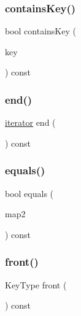 \mbox{\label{classMap_a37473445b6725c5f0fc59a32ea2e645e}} 
\subsubsection{\texorpdfstring{contains\+Key()}{containsKey()}}
{\footnotesize\ttfamily bool contains\+Key (\begin{DoxyParamCaption}\item[{const Key\+Type \&}]{key }\end{DoxyParamCaption}) const}

\mbox{\label{classMap_a68b688a51bd0cf6fb5bc2cba292209a8}} 
\subsubsection{\texorpdfstring{end()}{end()}}
{\footnotesize\ttfamily \mbox{\hyperlink{classMap_1_1iterator}{iterator}} end (\begin{DoxyParamCaption}{ }\end{DoxyParamCaption}) const\hspace{0.3cm}{\ttfamily [inline]}}

\mbox{\label{classMap_a91a1c833c72a288f2e2ea0207449513a}} 
\subsubsection{\texorpdfstring{equals()}{equals()}}
{\footnotesize\ttfamily bool equals (\begin{DoxyParamCaption}\item[{const \mbox{\hyperlink{classMap}{Map}}$<$ Key\+Type, Value\+Type $>$ \&}]{map2 }\end{DoxyParamCaption}) const}

\mbox{\label{classMap_a6e76878901fa73e176909ac015834f1a}} 
\subsubsection{\texorpdfstring{front()}{front()}}
{\footnotesize\ttfamily Key\+Type front (\begin{DoxyParamCaption}{ }\end{DoxyParamCaption}) const}

